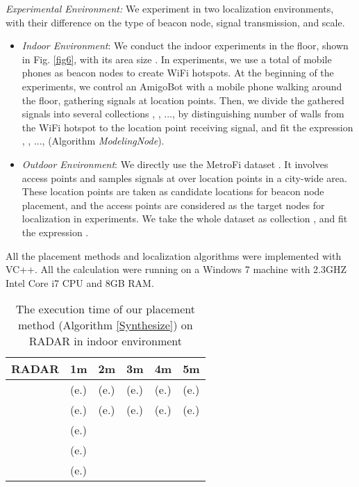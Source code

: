 \documentclass[10pt, conference, letterpaper]{IEEEtran}
\begin{document}
\emph{Experimental Environment:} We experiment in two localization environments, with their difference on the type of beacon node, signal transmission, and scale.
\begin{itemize}
  \item \emph{Indoor Environment}: We conduct the indoor experiments in the floor, shown in Fig. \ref{fig6}, with its area size . In experiments, we use a total of  mobile phones as beacon nodes to create WiFi hotspots. At the beginning of the experiments, we control an AmigoBot with a mobile phone walking around the floor, gathering signals at location points. Then, we divide the gathered signals into several collections , , ...,  by distinguishing number of walls from the WiFi hotspot to the location point receiving signal, and fit the expression , , ...,  (Algorithm \textit{ModelingNode}).
  \item \emph{Outdoor Environment}: We directly use the MetroFi dataset \cite{MetroFi11}. It involves  access points and samples signals at over  location points in a city-wide area. These location points are taken as candidate locations for beacon node placement, and the access points are considered as the target nodes for localization in experiments. We take the whole dataset as collection , and fit the expression .
\end{itemize}

All the placement methods and localization algorithms were implemented with VC++. All the calculation were running on a Windows 7 machine with 2.3GHZ Intel Core i7 CPU and 8GB RAM.

\begin{table}[!t]
\renewcommand{\arraystretch}{1.0}
\caption{The execution time of our placement method (Algorithm \ref{Synthesize}) on RADAR in indoor environment} \label{experiment_time_RADAR}
\centering
\begin{tabular}{|c|p{0.9cm}|p{0.9cm}|p{0.9cm}|p{0.9cm}|p{0.9cm}|}
  \hline
RADAR  & 1m & 2m & 3m & 4m & 5m \\
  \hline
   & (e.) & (e.) & (e.) & (e.) & (e.)  \\
  \hline
   & (e.) & (e.) & (e.) & (e.) & (e.) \\
  \hline
   & (e.) &  &  &  &  \\
  \hline
   & (e.) &  &  &  &  \\
  \hline
   & (e.) &  &  &  &  \\
  \hline
\end{tabular}
\end{table}
\end{document}
